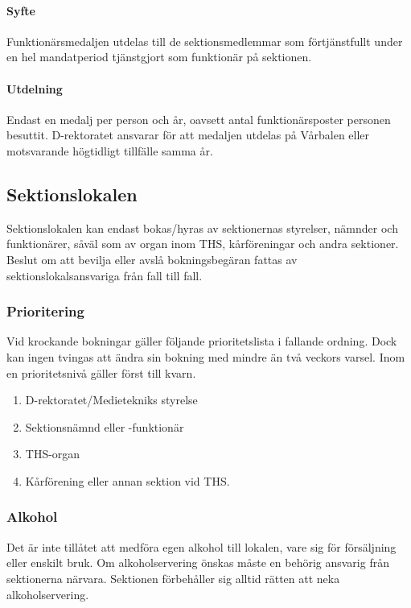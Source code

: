 \documentclass[a4paper,12pt]{article}
\begin{document}
\paragraph{Syfte}

Funktionärsmedaljen utdelas till de sektionsmedlemmar som förtjänstfullt under en hel mandatperiod tjänstgjort som funktionär på sektionen.

\paragraph{Utdelning}

Endast en medalj per person och år, oavsett antal funktionärsposter personen besuttit. D-rektoratet ansvarar för att medaljen utdelas på Vårbalen eller motsvarande högtidligt tillfälle samma år.

\subsection{Sektionslokalen}

Sektionslokalen kan endast bokas/hyras av sektionernas styrelser, nämnder och funktionärer, såväl som av organ inom THS, kårföreningar och andra sektioner. Beslut om att bevilja eller avslå bokningsbegäran fattas av sektionslokalsansvariga från fall till fall.

\subsubsection{Prioritering}

Vid krockande bokningar gäller följande prioritetslista i fallande ordning. Dock kan
ingen tvingas att ändra sin bokning med mindre än två veckors varsel. Inom en prioritetsnivå gäller först till kvarn.

\begin{enumerate}
  \item D-rektoratet/Medietekniks styrelse
  \item Sektionsnämnd eller -funktionär
  \item THS-organ
  \item Kårförening eller annan sektion vid THS.
\end{enumerate}

\subsubsection{Alkohol}

Det är inte tillåtet att medföra egen alkohol till lokalen, vare sig för försäljning eller enskilt bruk. Om alkoholservering önskas måste en behörig ansvarig från sektionerna närvara. Sektionen förbehåller sig alltid rätten att neka alkoholservering.
\end{document}
